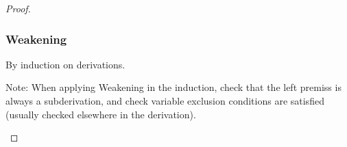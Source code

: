 \documentclass[11pt]{article}
\begin{document}
    \begin{proof}
        \vphantom{.} \\
        \subsubsection*{Weakening}
        By induction on derivations. \\
        \par Note: When applying Weakening in the induction, check that the left premiss is always a subderivation,
        and check variable exclusion conditions are satisfied (usually checked elsewhere in the derivation). \\
        \begin{mathpar}
\end{mathpar}
\end{proof}
\end{document}
